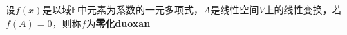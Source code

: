 
\begin{definition}{}
设$f(x)$是以域$\mathbb F$中元素为系数的一元多项式，$A$是线性空间$V$上的线性变换，若$f(A)=0$，则称$f$为\textbf{零化duoxan}
\end{definition}
